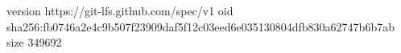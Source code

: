 version https://git-lfs.github.com/spec/v1
oid sha256:fb0746a2e4c9b507f23909daf5f12c03eed6e035130804dfb830a62747b6b7ab
size 349692
